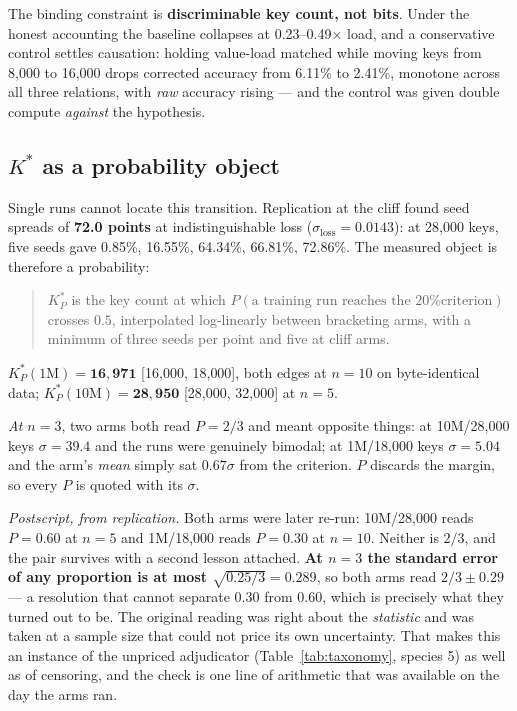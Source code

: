 The binding constraint is \textbf{discriminable key count, not bits}. Under the honest accounting the
baseline collapses at 0.23--0.49$\times$ load, and a conservative control settles causation: holding
value-load matched while moving keys from 8{,}000 to 16{,}000 drops corrected accuracy from 6.11\% to
2.41\%, monotone across all three relations, with \emph{raw} accuracy rising --- and the control was
given double compute \emph{against} the hypothesis.

\subsection{$K^*$ as a probability object}
\label{sec:kstar}

Single runs cannot locate this transition. Replication at the cliff found seed spreads of
\textbf{72.0 points} at indistinguishable loss ($\sigma_{\text{loss}} = 0.0143$): at 28{,}000 keys,
five seeds gave 0.85\%, 16.55\%, 64.34\%, 66.81\%, 72.86\%.
The measured object is therefore a probability:

\begin{quote}
$K^*_P$ is the key count at which $P(\text{a training run reaches the 20\% criterion})$ crosses
$0.5$, interpolated log-linearly between bracketing arms, with a minimum of three seeds per point
and five at cliff arms.
\end{quote}

\noindent
$K^*_P(\text{1M}) = \mathbf{16{,}971}$ [16{,}000, 18{,}000], both edges at $n = 10$ on
byte-identical data; $K^*_P(\text{10M}) = \mathbf{28{,}950}$ [28{,}000, 32{,}000] at
$n = 5$.

\begin{remark}
\emph{At $n = 3$}, two arms both read $P = 2/3$ and meant opposite things: at 10M/28{,}000 keys
$\sigma = 39.4$ and the runs were genuinely bimodal; at 1M/18{,}000 keys $\sigma = 5.04$ and the
arm's \emph{mean} simply sat $0.67\sigma$ from the criterion. $P$ discards the margin, so every $P$
is quoted with its $\sigma$.

\emph{Postscript, from replication.} Both arms were later re-run: 10M/28{,}000 reads
$P = \mathbf{0.60}$ at $n = 5$ and 1M/18{,}000 reads $P = \mathbf{0.30}$ at $n = 10$. Neither is
$2/3$, and the pair survives with a second lesson attached. \textbf{At $n = 3$ the standard error of
any proportion is at most $\sqrt{0.25/3} = 0.289$}, so both arms read $2/3 \pm 0.29$ --- a
resolution that cannot separate $0.30$ from $0.60$, which is precisely what they turned out to be.
The original reading was right about the \emph{statistic} and was taken at a sample size that could
not price its own uncertainty. That makes this an instance of the unpriced adjudicator
(Table~\ref{tab:taxonomy}, species 5) as well as of censoring, and the check is one line of
arithmetic that was available on the day the arms ran.
\end{remark}

